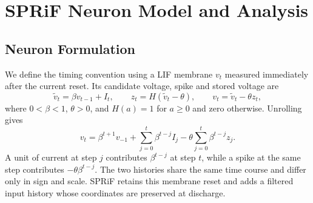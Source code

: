 \documentclass[letterpaper,journal]{IEEEtran}
\begin{document}
\section{SPRiF Neuron Model and Analysis}
\label{sec:model}

\subsection{Neuron Formulation}
\label{sec:motivation}
\label{sec:forward}

We define the timing convention using a LIF membrane $v_t$ measured immediately after the current reset. Its candidate voltage, spike and stored voltage are
\begin{equation}
\widetilde v_t=\beta v_{t-1}+I_t,\qquad
z_t=H(\widetilde v_t-\theta),\qquad
v_t=\widetilde v_t-\theta z_t,
\label{eq:lif}
\end{equation}
where $0<\beta<1$, $\theta>0$, and $H(a)=1$ for $a\geq0$ and zero otherwise. Unrolling gives
\begin{equation}
v_t=\beta^{t+1}v_{-1}
+\sum_{j=0}^{t}\beta^{t-j} I_j
-\theta\sum_{j=0}^{t}\beta^{t-j}z_j.
\label{eq:lif_unrolled}
\end{equation}
A unit of current at step $j$ contributes $\beta^{t-j}$ at step $t$, while a spike at the same step contributes $-\theta\beta^{t-j}$. The two histories share the same time course and differ only in sign and scale. SPRiF retains this membrane reset and adds a filtered input history whose coordinates are preserved at discharge.
\end{document}

